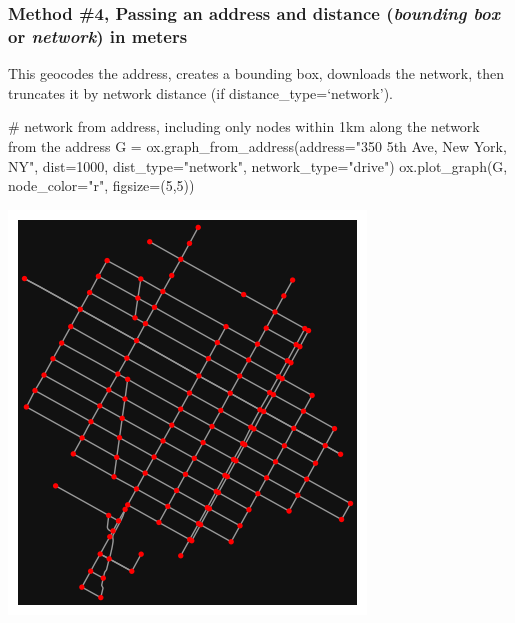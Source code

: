 \documentclass[
  letterpaper,
  DIV=11,
  numbers=noendperiod]{scrreprt}
\newenvironment{Shaded}{\begin{snugshade}}{\end{snugshade}}
\newcommand{\CommentTok}[1]{\textcolor[rgb]{0.37,0.37,0.37}{#1}}
\newcommand{\DecValTok}[1]{\textcolor[rgb]{0.68,0.00,0.00}{#1}}
\newcommand{\NormalTok}[1]{\textcolor[rgb]{0.00,0.23,0.31}{#1}}
\newcommand{\OperatorTok}[1]{\textcolor[rgb]{0.37,0.37,0.37}{#1}}
\newcommand{\StringTok}[1]{\textcolor[rgb]{0.13,0.47,0.30}{#1}}
\begin{document}
\subsubsection{\texorpdfstring{Method \#4, Passing an address and
distance (\emph{bounding box} or \emph{network}) in
meters}{Method \#4, Passing an address and distance (bounding box or network) in meters}}\label{method-4-passing-an-address-and-distance-bounding-box-or-network-in-meters}

This geocodes the address, creates a bounding box, downloads the
network, then truncates it by network distance (if
distance\_type=`network').

\begin{Shaded}
\begin{Highlighting}[]
\CommentTok{\# network from address, including only nodes within 1km along the network from the address}
\NormalTok{G }\OperatorTok{=}\NormalTok{ ox.graph\_from\_address(address}\OperatorTok{=}\StringTok{"350 5th Ave, New York, NY"}\NormalTok{, dist}\OperatorTok{=}\DecValTok{1000}\NormalTok{, dist\_type}\OperatorTok{=}\StringTok{"network"}\NormalTok{, network\_type}\OperatorTok{=}\StringTok{"drive"}\NormalTok{)}
\NormalTok{ox.plot\_graph(G, node\_color}\OperatorTok{=}\StringTok{"r"}\NormalTok{, figsize}\OperatorTok{=}\NormalTok{(}\DecValTok{5}\NormalTok{,}\DecValTok{5}\NormalTok{))}
\end{Highlighting}
\end{Shaded}

\includegraphics{labs/w07_OSM_files/figure-pdf/cell-10-output-1.png}
\end{document}
